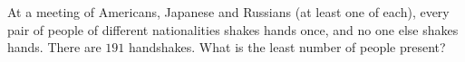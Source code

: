 At a meeting of Americans, Japanese and Russians (at least one of each), every pair of people of different nationalities shakes hands once, and no one else shakes hands. There are $191$ handshakes. What is the least number of people present?
